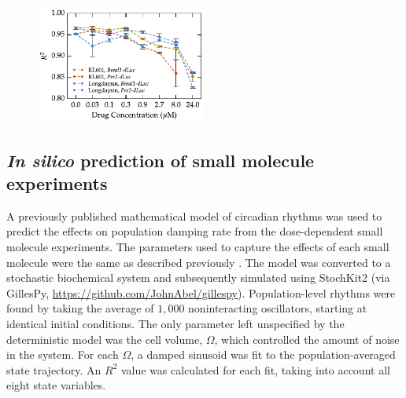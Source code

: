 \begin{figure}[tbp]
  \begin{center}
    \includegraphics[width=0.5\textwidth]{chap6/figures/small_molecule_r2.pdf}
  \end{center}
\label{fig:small_molecule_r2}
\end{figure}

\subsection{{\itshape In silico} prediction of small molecule experiments}
A previously published mathematical model of circadian rhythms \cite{Hirota2012} was used to predict the effects on population damping rate from the dose-dependent small molecule experiments.
The parameters used to capture the effects of each small molecule were the same as described previously \cite{St.John2014}.
The model was converted to a stochastic biochemical system and subsequently simulated using StochKit2 \cite{Sanft2011a} (via GillesPy, \url{https://github.com/JohnAbel/gillespy}).
Population-level rhythms were found by taking the average of $1,000$ noninteracting oscillators, starting at identical initial conditions.
The only parameter left unspecified by the deterministic model was the cell volume, $\Omega$, which controlled the amount of noise in the system.
For each $\Omega$, a damped sinusoid was fit to the population-averaged state trajectory. 
An $R^2$ value was calculated for each fit, taking into account all eight state variables.

